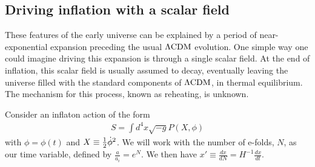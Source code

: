     \subsection{Driving inflation with a scalar field}
    These features of the early universe can be explained by a period of near-exponential expansion
    preceding the usual $\Lambda\text{CDM}$ evolution.
    One simple way one could imagine driving this expansion is through a single
    scalar field.
    At the end of inflation, this scalar field is usually assumed to decay,
    eventually leaving the universe filled with the standard components of $\Lambda\text{CDM}$,
    in thermal equilibrium. The mechanism for this process, known as reheating, is unknown.


Consider an inflaton action of the form
\begin{align}\label{inflaton_action}
S = \int d^4x \sqrt{-g}P(X,\phi)
\end{align}
with $\phi=\phi(t)$ and $X\equiv\frac{1}{2}\dot{\phi}^2$.
We will work with the number of e-folds, $N$, as our time variable,
defined by $\frac{a}{a_i}=e^N$.
We then have
$x'\equiv\frac{dx}{dN}=H^{-1}\frac{dx}{dt}$.


